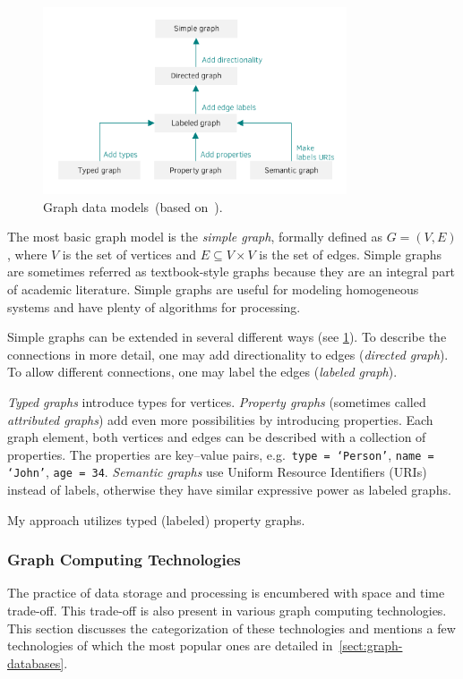 \begin{figure}[!ht]
	\centering
	\includegraphics[width=0.8\textwidth]{include/figures/graph-classes}
	\caption{Graph data models~(based on~\cite{DBLP:journals/corr/abs-1006-2361}).}
	\label{fig:graph-classes}
\end{figure}

The most basic graph model is the \emph{simple graph}, formally defined as $G = (V, E)$, where $V$ is the set of vertices and $E \subseteq V \times V$ is the set of edges. Simple graphs are sometimes referred as textbook-style graphs because they are an integral part of academic literature. Simple graphs are useful for modeling homogeneous systems and have plenty of algorithms for processing.

Simple graphs can be extended in several different ways (see \cref{fig:graph-classes}). To describe the connections in more detail, one may add directionality to edges (\emph{directed graph}). To allow different connections, one may label the edges (\emph{labeled graph}).

\emph{Typed graphs} introduce types for vertices. \emph{Property graphs} (sometimes called \emph{attributed graphs}) add even more possibilities by introducing properties. Each graph element, both vertices and edges can be described with a collection of properties. The properties are key--value pairs, e.g.\ \texttt{type = `Person'}, \texttt{name = `John'}, \texttt{age = 34}. \emph{Semantic graphs} use Uniform Resource Identifiers (URIs) instead of labels, otherwise they have similar expressive power as labeled graphs.

My approach utilizes typed (labeled) property graphs.

\subsubsection{Graph Computing Technologies}
The practice of data storage and processing is encumbered with space and time trade-off. This trade-off is also present in various graph computing technologies. This section discusses the categorization of these technologies and mentions a few technologies of which the most popular ones are detailed in~\cref{sect:graph-databases}.

